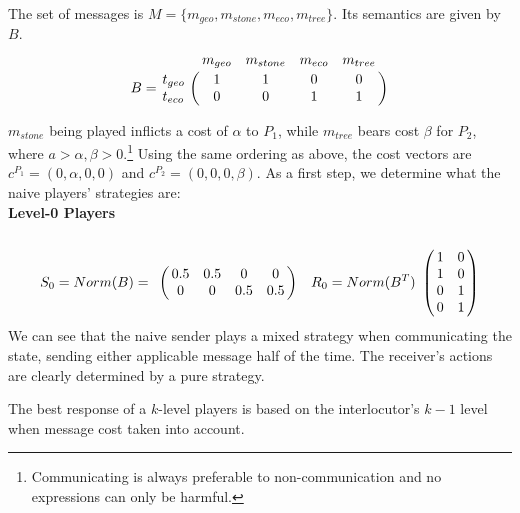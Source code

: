 \documentclass[10pt,a4paper]{article}
\begin{document}
The set of messages is $M=\{m_{geo}, m_{stone}, m_{eco}, m_{tree}\}$. Its semantics are given by $B$.
 \begin{equation*}
 B =
 \bordermatrix{
            & m_{geo} & m_{stone} & m_{eco} & m_{tree}    \cr
   t_{geo}  &       1 &         1 & 0       & 0 \cr
   t_{eco}  &       0 &         0 & 1       & 1
 }
 \end{equation*}

$m_{stone}$ being played inflicts a cost of $\alpha$ to $P_1$, while $m_{tree}$ bears cost $\beta$ for $P_2$, where $a>\alpha,\beta>0$.\footnote{Communicating is always preferable to non-communication and no expressions can only be harmful.} Using the same ordering as above, the cost vectors are $c^{P_1}=(0,\alpha,0,0)$ and $c^{P_2}=(0,0,0,\beta)$. As a first step, we determine what the naive players' strategies are:\\
\textbf{Level-0 Players}\\
\begin{equation*}
S_0=Norm(B)=
\bordermatrix{
            & & & &    \cr
 &       0.5 &         0.5 & 0       & 0 \cr
 &       0 &         0 & 0.5       & 0.5
 }\quad
R_0=Norm(B^T)
\bordermatrix{
            &  & \cr
    & 1 & 0 \cr
     & 1 & 0 \cr
     & 0 & 1 \cr
     & 0 & 1 \cr
 }
\end{equation*}
We can see that the naive sender plays a mixed strategy when communicating the state, sending either applicable message half of the time. The receiver's actions are clearly determined by a pure strategy.

The best response of a $k$-level players is based on the interlocutor's $k-1$ level when message cost taken into account.
\end{document}
